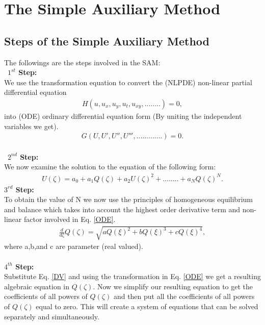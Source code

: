 \documentclass{article}
\numberwithin{equation}{section}
\begin{document}
\section{The Simple Auxiliary Method }
\subsection{Steps of the Simple Auxiliary Method}
The followings are the steps involved in the SAM:\\\
\textbf{\textbf{$1^{st}$} Step:}\\
We use the transformation equation
to convert the (NLPDE) non-linear partial differential equation
\begin{eqnarray}\label{NLPDE}
H(u,u_x,u_y,u_t,u_{xy},........)=0,
\end{eqnarray}
into (ODE) ordinary differential equation form (By uniting the independent variables we get).
\begin{eqnarray}\label{ODE}
G(U,U',U'',U''',.............)=0.
\end{eqnarray}\\\
\textbf{\textbf{$2^{nd}$} Step:}\\
 We now examine the solution to the equation of the following form:
\begin{eqnarray}\label{TF}
U \! \left(\zeta \right)= a_{0} + a_{1} Q \! \left(\zeta \right)+ a_{2} {U \! \left(\zeta \right)}^{2} +........+a_{N} {Q \! \left(\zeta \right)}^{N}.
\end{eqnarray}
\textbf{\textbf{$3^{rd}$} Step:}\\
To obtain the value of N we now use the principles of homogeneous equilibrium and balance which takes into account the highest order derivative term and non-linear factor involved in Eq. \ref{ODE}.
\begin{eqnarray}\label{DV}
\frac{d}{d \zeta}Q \! \left(\zeta \right) =\sqrt{a Q \! \left(\xi \right)^{2}+b Q \! \left(\xi \right)^{3}+c Q \! \left(\xi \right)^{4}},
\end{eqnarray}
where a,b,and c are parameter (real valued).\\\\
\textbf{\textbf{$4^{th}$} Step:}\\
Substitute Eq. \ref{DV} and using the transformation in Eq. \ref{ODE} we get a resulting algebraic equation in ${Q(\zeta)}$. Now we simplify our resulting equation to get the coefficients of all powers of ${Q(\zeta)}$ and then put all the coefficients of all powers of $Q{(\zeta)}$ equal to zero. This will create a system of equations that can be solved separately and simultaneously.\\\
\end{document}

